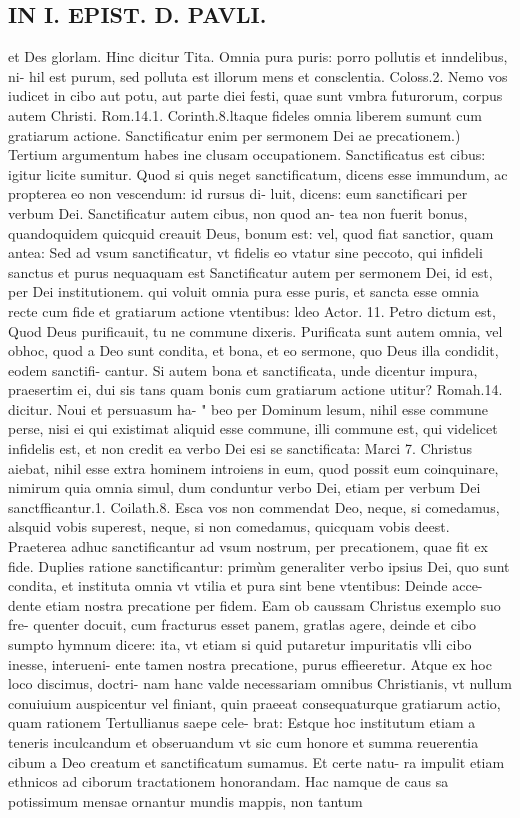 \documentclass{article}
\begin{document}
\begin{pages}
\section*{IN I. EPIST. D. PAVLI. }
\marginpar{[ p.94 ]}
\marginpar{[ p.95 ]}\pstart et Des glorlam. Hinc dicitur Tita. Omnia pura puris: porro pollutis et inndelibus, ni- hil est purum, sed polluta est illorum mens et consclentia. Coloss.2. Nemo vos iudicet in cibo aut potu, aut parte diei festi, quae sunt vmbra futurorum, corpus autem Christi. Rom.14.1. Corinth.8.ltaque fideles omnia liberem sumunt cum gratiarum actione.  \pend\pstart Sanctificatur enim per sermonem Dei ae precationem.) Tertium argumentum habes ine clusam occupationem. Sanctificatus est cibus: igitur licite sumitur. Quod si quis neget sanctificatum, dicens esse immundum, ac propterea eo non vescendum: id rursus di- luit, dicens: eum sanctificari per verbum Dei. Sanctificatur autem cibus, non quod an- tea non fuerit bonus, quandoquidem quicquid creauit Deus, bonum est: vel, quod fiat sanctior, quam antea: Sed ad vsum sanctificatur, vt fidelis eo vtatur sine peccoto, qui infideli sanctus et purus nequaquam est Sanctificatur autem per sermonem Dei, id est, per Dei institutionem. qui voluit omnia pura esse puris, et sancta esse omnia recte cum fide et gratiarum actione vtentibus: ldeo Actor. 11. Petro dictum est, Quod Deus purificauit, tu ne commune dixeris. Purificata sunt autem omnia, vel obhoc, quod a Deo sunt condita, et bona, et eo sermone, quo Deus illa condidit, eodem sanctifi- cantur. Si autem bona et sanctificata, unde dicentur impura, praesertim ei, dui sis tans quam bonis cum gratiarum actione utitur? Romah.14. dicitur. Noui et persuasum ha- " beo per Dominum lesum, nihil esse commune perse, nisi ei qui existimat aliquid esse  commune, illi commune est, qui videlicet infidelis est, et non credit ea verbo Dei esi  se sanctificata: Marci 7. Christus aiebat, nihil esse extra hominem introiens in eum, quod possit eum coinquinare, nimirum quia omnia simul, dum conduntur verbo Dei, etiam per verbum Dei sanctfficantur.1. Coilath.8. Esca vos non commendat Deo, neque, si comedamus, alsquid vobis superest, neque, si non comedamus, quicquam vobis deest. Praeterea adhuc sanctificantur ad vsum nostrum, per precationem, quae fit ex fide. Duplies ratione sanctificantur: primùm generaliter verbo ipsius Dei, quo sunt condita, et instituta omnia vt vtilia et pura sint bene vtentibus: Deinde acce- dente etiam nostra precatione per fidem. Eam ob caussam Christus exemplo suo fre- quenter docuit, cum fracturus esset panem, gratlas agere, deinde et cibo sumpto hymnum dicere: ita, vt etiam si quid putaretur impuritatis vlli cibo inesse, interueni- ente tamen nostra precatione, purus effieeretur. Atque ex hoc loco discimus, doctri- nam hanc valde necessariam omnibus Christianis, vt nullum conuiuium auspicentur vel finiant, quin praeeat consequaturque gratiarum actio, quam rationem Tertullianus saepe cele- brat: Estque hoc institutum etiam a teneris inculcandum et obseruandum vt sic cum honore et summa reuerentia cibum a Deo creatum et sanctificatum sumamus. Et certe natu- ra impulit etiam ethnicos ad ciborum tractationem honorandam. Hac namque de caus sa potissimum mensae ornantur mundis mappis, non tantum 
\end{pages}
\end{document}
